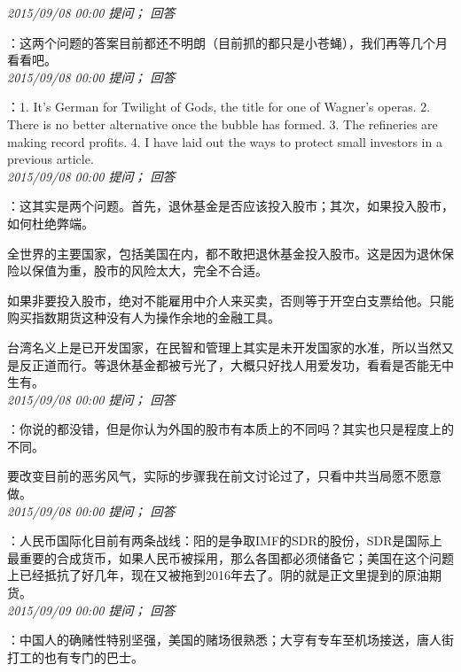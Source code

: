 \documentclass[twocolumn]{ctexart}
\begin{document}
\textit{\hfill\noindent\small 2015/09/08 00:00 提问； 回答}

：这两个问题的答案目前都还不明朗（目前抓的都只是小苍蝇），我们再等几个月看看吧。\\

\textit{\hfill\noindent\small 2015/09/08 00:00 提问； 回答}

：1. It's German for Twilight of Gods, the title for one of Wagner's operas.
2. There is no better alternative once the bubble has formed.
3. The refineries are making record profits.
4. I have laid out the ways to protect small investors in a previous article.\\

\textit{\hfill\noindent\small 2015/09/08 00:00 提问； 回答}

：这其实是两个问题。首先，退休基金是否应该投入股市；其次，如果投入股市，如何杜绝弊端。

全世界的主要国家，包括美国在内，都不敢把退休基金投入股市。这是因为退休保险以保值为重，股市的风险太大，完全不合适。

如果非要投入股市，绝对不能雇用中介人来买卖，否则等于开空白支票给他。只能购买指数期货这种没有人为操作余地的金融工具。

台湾名义上是已开发国家，在民智和管理上其实是未开发国家的水准，所以当然又是反正道而行。等退休基金都被亏光了，大概只好找人用爱发功，看看是否能无中生有。\\

\textit{\hfill\noindent\small 2015/09/08 00:00 提问； 回答}

：你说的都没错，但是你认为外国的股市有本质上的不同吗？其实也只是程度上的不同。

要改变目前的恶劣风气，实际的步骤我在前文讨论过了，只看中共当局愿不愿意做。\\

\textit{\hfill\noindent\small 2015/09/08 00:00 提问； 回答}

：人民币国际化目前有两条战线：阳的是争取IMF的SDR的股份，SDR是国际上最重要的合成货币，如果人民币被採用，那么各国都必须储备它；美国在这个问题上已经抵抗了好几年，现在又被拖到2016年去了。阴的就是正文里提到的原油期货。\\

\textit{\hfill\noindent\small 2015/09/09 00:00 提问； 回答}

：中国人的确赌性特别坚强，美国的赌场很熟悉；大亨有专车至机场接送，唐人街打工的也有专门的巴士。\\
\end{document}
